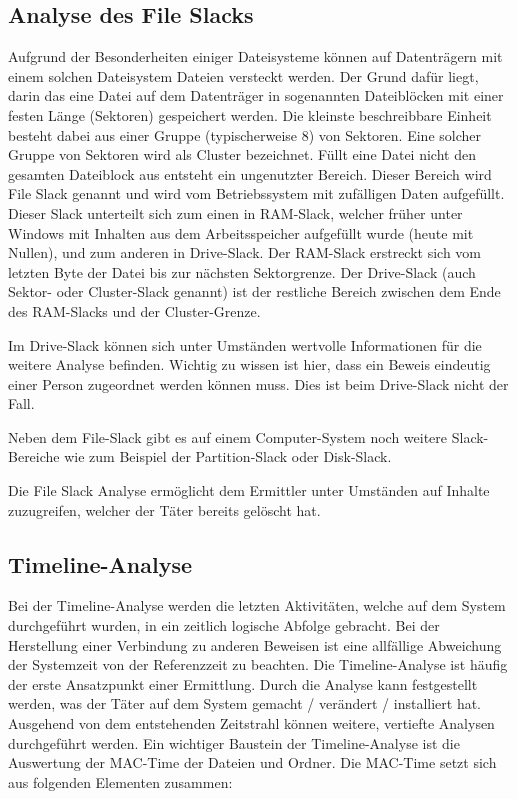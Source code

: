 \subsection{Analyse des File Slacks}
Aufgrund der Besonderheiten einiger Dateisysteme können auf Datenträgern mit einem solchen Dateisystem Dateien versteckt werden. Der Grund dafür liegt, darin das eine Datei auf dem Datenträger in sogenannten Dateiblöcken mit einer festen Länge (Sektoren) gespeichert werden. Die kleinste beschreibbare Einheit besteht dabei aus einer Gruppe (typischerweise 8) von Sektoren. Eine solcher Gruppe von Sektoren wird als Cluster bezeichnet. Füllt eine Datei nicht den gesamten Dateiblock aus entsteht ein ungenutzter Bereich. Dieser Bereich wird File Slack genannt und wird vom Betriebssystem mit zufälligen Daten aufgefüllt. Dieser Slack unterteilt sich zum einen in RAM-Slack, welcher früher unter Windows mit Inhalten aus dem Arbeitsspeicher aufgefüllt wurde (heute mit Nullen), und zum anderen in Drive-Slack. Der RAM-Slack erstreckt sich vom letzten Byte der Datei bis zur nächsten Sektorgrenze. Der Drive-Slack (auch Sektor- oder Cluster-Slack genannt) ist der restliche Bereich zwischen dem Ende des RAM-Slacks und der Cluster-Grenze.

Im Drive-Slack können sich unter Umständen wertvolle Informationen für die weitere Analyse befinden. Wichtig zu wissen ist hier, dass ein Beweis eindeutig einer Person zugeordnet werden können muss. Dies ist beim Drive-Slack nicht der Fall.

Neben dem File-Slack gibt es auf einem Computer-System noch weitere Slack-Bereiche wie zum Beispiel der Partition-Slack oder Disk-Slack.

Die File Slack Analyse ermöglicht dem Ermittler unter Umständen auf Inhalte zuzugreifen, welcher der Täter bereits gelöscht hat.


\subsection{Timeline-Analyse}
Bei der Timeline-Analyse werden die letzten Aktivitäten, welche auf dem System durchgeführt wurden, in ein zeitlich logische Abfolge gebracht. Bei der Herstellung einer Verbindung zu anderen Beweisen ist eine allfällige Abweichung der Systemzeit von der Referenzzeit zu beachten. Die Timeline-Analyse ist häufig der erste Ansatzpunkt einer Ermittlung. Durch die Analyse kann festgestellt werden, was der Täter auf dem System gemacht / verändert / installiert hat. Ausgehend von dem entstehenden Zeitstrahl können weitere, vertiefte Analysen durchgeführt werden. Ein wichtiger Baustein der Timeline-Analyse ist die Auswertung der MAC-Time der Dateien und Ordner. Die MAC-Time setzt sich aus folgenden Elementen zusammen:

